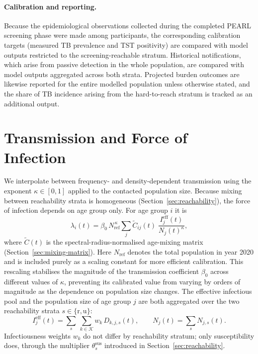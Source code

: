 \documentclass[11pt]{article}
\begin{document}
\paragraph{Calibration and reporting.}
Because the epidemiological observations collected during the completed PEARL screening phase were made among participants, the corresponding calibration targets (measured TB prevalence and TST positivity) are compared with model outputs restricted to the screening-reachable stratum. Historical notifications, which arise from passive detection in the whole population, are compared with model outputs aggregated across both strata. Projected burden outcomes are likewise reported for the entire modelled population unless otherwise stated, and the share of TB incidence arising from the hard-to-reach stratum is tracked as an additional output.

\section{Transmission and Force of Infection}
\label{sec:transmission}

We interpolate between frequency- and density-dependent transmission using the exponent \(\kappa\in[0,1]\) applied to the contacted population size. Because mixing between reachability strata is homogeneous (Section~\ref{sec:reachability}), the force of infection depends on age group only. For age group \(i\) it is
\[
\lambda_i(t)
=
\beta_0\, N_{\mathrm{ref}}^{\,\kappa}
\sum_{j}
\tilde{C}_{ij}(t)\;
\frac{I^{\mathrm{eff}}_j(t)}{N_j(t)^{\kappa}},
\]
where \(\tilde{C}(t)\) is the spectral-radius-normalised age-mixing matrix (Section~\ref{sec:mixing-matrix}).  Here \(N_{\mathrm{ref}}\) denotes the total population in year 2020 and is included purely as a scaling constant for more efficient calibration. This rescaling stabilises the magnitude of the transmission coefficient \(\beta_0\) across different values of \(\kappa\), preventing its calibrated value from varying by orders of magnitude as the dependence on population size changes.
The effective infectious pool and the population size of age group \(j\) are both aggregated over the two reachability strata \(s\in\{\mathrm{r},\mathrm{u}\}\):
\[
I^{\mathrm{eff}}_j(t) =
\sum_{s}\ \sum_{k\in\mathcal{K}} w_k\, D_{k,j,s}(t),
\qquad
N_j(t) = \sum_{s} N_{j,s}(t).
\]
Infectiousness weights \(w_k\) do not differ by reachability stratum; only susceptibility does, through the multiplier \(\theta^{\mathrm{sus}}_s\) introduced in Section~\ref{sec:reachability}.
\end{document}

